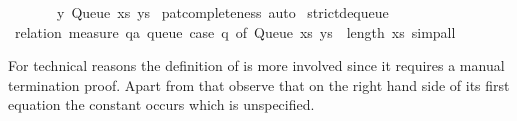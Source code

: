 \begin{isabellebody}
\ \ \ \ \ \ \ {\isacharparenleft}y{\isacharcomma}\ Queue\ xs\ ys{\isacharparenright}{\isachardoublequoteclose}\isanewline
{}\isamarkupfalse%
\ pat{\isacharunderscore}completeness\ auto\isanewline
\isanewline
{}\isamarkupfalse%
\ strict{\isacharunderscore}dequeue{\isacharprime}\isanewline
{}\isamarkupfalse%
\ {\isacharparenleft}relation\ {\isachardoublequoteopen}measure\ {\isacharparenleft}{\isasymlambda}q{\isacharcolon}{\isacharcolon}{\isacharprime}a\ queue{\isachardot}\ case\ q\ of\ Queue\ xs\ ys\ {\isasymRightarrow}\ length\ xs{\isacharparenright}{\isachardoublequoteclose}{\isacharparenright}\ simp{\isacharunderscore}all%
\endisatagquote
{\isafoldquote}%
%
\isadelimquote
%
\endisadelimquote
%
\begin{isamarkuptext}%
\noindent For technical reasons the definition of
   is more involved since it requires
  a manual termination proof.  Apart from that observe that
  on the right hand side of its first equation the constant
   occurs which is unspecified.


\end{isamarkuptext}
\end{isabellebody}
